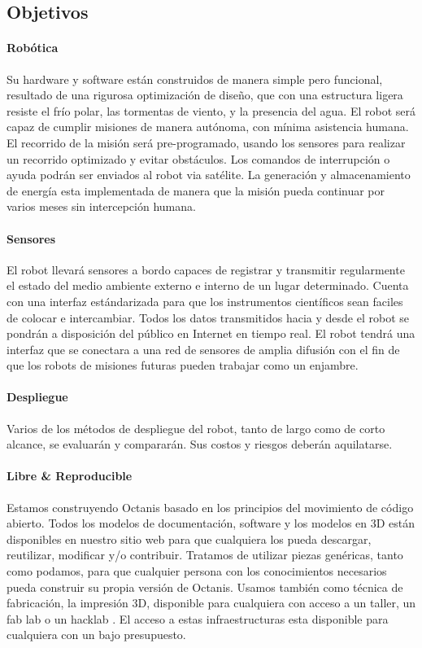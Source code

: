 \documentclass[a4paper,12pt]{article}
\begin{document}
\subsection{Objetivos}

\paragraph{Robótica}
Su hardware y software están construidos de manera simple pero funcional, resultado de una rigurosa optimización de diseño, que con una estructura ligera resiste el frío polar, las tormentas de viento,  y la presencia del agua. El robot será capaz de cumplir misiones de manera autónoma, con mínima asistencia humana. El recorrido de la misión será pre-programado, usando los sensores para realizar un recorrido optimizado y evitar obstáculos. Los comandos de interrupción o ayuda podrán ser enviados al robot via satélite. La generación y almacenamiento de energía esta implementada de manera que la misión pueda continuar por varios meses sin intercepción humana. 

\paragraph{Sensores}
El robot llevará sensores a bordo capaces de registrar y transmitir regularmente el estado del medio ambiente externo e interno de un lugar determinado. Cuenta con una interfaz estándarizada para que los instrumentos científicos sean faciles de colocar e intercambiar. Todos los datos transmitidos hacia y desde el robot se pondrán a disposición del público en Internet en tiempo real. El robot tendrá una interfaz que se conectara a una red de sensores de amplia difusión  con el fin de que los robots de misiones futuras pueden trabajar como un enjambre.

\paragraph{Despliegue}
Varios de los métodos de despliegue del robot, tanto de largo como de corto alcance, se evaluarán y compararán. Sus costos y riesgos deberán aquilatarse.


\paragraph{Libre \& Reproducible} 
Estamos construyendo Octanis basado en los principios del movimiento de código abierto. Todos los modelos de documentación, software y los modelos en 3D están disponibles en nuestro sitio web para que cualquiera los pueda descargar, reutilizar, modificar y/o contribuir. Tratamos de utilizar piezas genéricas, tanto como podamos, para que cualquier persona con los conocimientos necesarios pueda construir su propia versión de Octanis. Usamos también como técnica de fabricación, la impresión 3D, disponible para cualquiera con acceso a un taller, un fab lab \cite{fablab} o un hacklab \cite{hackerspace}. El acceso a estas infraestructuras esta disponible para cualquiera con un bajo presupuesto.
 
\end{document}
